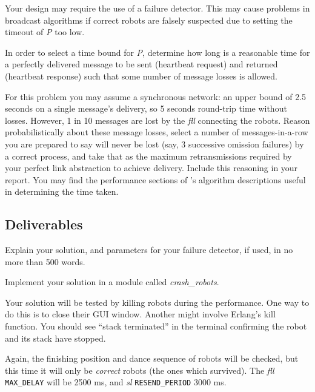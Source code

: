 \documentclass[a4paper]{article}
\begin{document}
Your design may require the use of a failure detector. This may cause problems
in broadcast algorithms if correct robots are falsely suspected due to setting
the timeout of \emph{P} too low.

In order to select a time bound for \emph{P}, determine how long is a
reasonable time for a perfectly delivered message to be sent (heartbeat
request) and returned (heartbeat response) such that some number of message
losses is allowed.

For this problem you may assume a synchronous network: an upper bound of 2.5
seconds on a single message's delivery, so 5 seconds round-trip time without
losses. However, 1 in 10 messages are lost by the \emph{fll} connecting the
robots. Reason probabilistically about these message losses, select a number
of messages-in-a-row you are prepared to say will never be lost (say, 3
successive omission failures) by a correct process, and take that as the
maximum retransmissions required by your perfect link abstraction to achieve
delivery. Include this reasoning in your report. You may find the performance
sections of \cite{cachin2011}'s algorithm descriptions useful in determining
the time taken.




\subsection*{Deliverables} %
\label{sub:p2_deliverable}

Explain your solution, and parameters for your failure detector, if used, in
no more than 500 words.

Implement your solution in a module called \emph{crash\_robots}.

Your solution will be tested by killing robots during the performance. One way
to do this is to close their GUI window. Another might involve Erlang's kill
function. You should see ``stack terminated'' in the terminal confirming the
robot and its stack have stopped.

Again, the finishing position and dance sequence of robots will be checked,
but this time it will only be \emph{correct} robots (the ones which survived).
The \emph{fll} \verb!MAX_DELAY! will be 2500 ms, and \emph{sl}
\verb!RESEND_PERIOD! 3000 ms.
\end{document}
